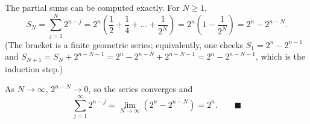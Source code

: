 The partial sums can be computed exactly. For $N\ge1$,
\[
S_N=\sum_{j=1}^{N}2^{n-j}=2^n\left(\dfrac{1}{2}+\dfrac{1}{4}+\dots+\dfrac{1}{2^N}\right)=2^n\left(1-\dfrac{1}{2^N}\right)=2^n-2^{n-N}.
\]
(The bracket is a finite geometric series; equivalently, one checks $S_1=2^n-2^{n-1}$ and $S_{N+1}=S_N+2^{n-N-1}=2^n-2^{n-N}+2^{n-N-1}=2^n-2^{n-N-1}$, which is the induction step.)

As $N\to\infty$, $2^{n-N}\to0$, so the series converges and
\[
\sum_{j=1}^{\infty}2^{n-j}=\lim_{N\to\infty}\left(2^n-2^{n-N}\right)=2^n .\qquad\blacksquare
\]
